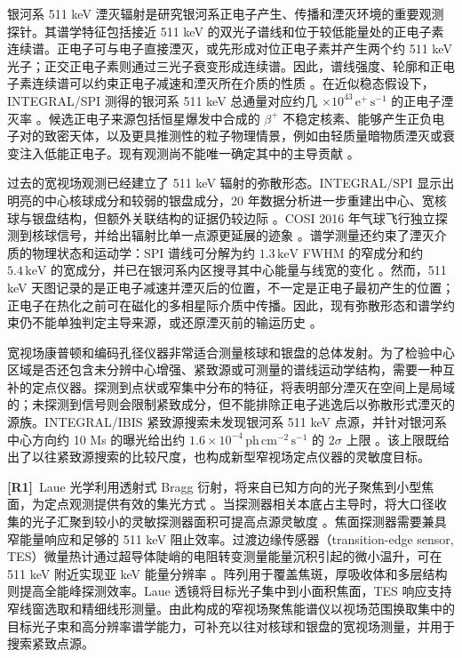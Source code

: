 \documentclass[11pt]{article}
\newcommand{\revmark}[1]{\textcolor{revisionblue}{\textbf{[R#1]}}\ }
\newcommand{\keV}{\,\mathrm{keV}}
\newcommand{\phcms}{\,\mathrm{ph\,cm^{-2}\,s^{-1}}}
\begin{document}
银河系 511 keV 湮灭辐射是研究银河系正电子产生、传播和湮灭环境的重要观测探针。其谱学特征包括接近 511 keV 的双光子谱线和位于较低能量处的正电子素连续谱。正电子可与电子直接湮灭，或先形成对位正电子素并产生两个约 511 keV 光子；正交正电子素则通过三光子衰变形成连续谱。因此，谱线强度、轮廓和正电子素连续谱可以约束正电子减速和湮灭所在介质的性质 \cite{Prantzos2011,Jean2006}。在近似稳态假设下，INTEGRAL/SPI 测得的银河系 511 keV 总通量对应约几 $\times10^{43}\,\mathrm{e^+\,s^{-1}}$ 的正电子湮灭率 \cite{Prantzos2011,Kierans2020}。候选正电子来源包括恒星爆发中合成的 $\beta^+$ 不稳定核素、能够产生正负电子对的致密天体，以及更具推测性的粒子物理情景，例如由轻质量暗物质湮灭或衰变注入低能正电子。现有观测尚不能唯一确定其中的主导贡献 \cite{Prantzos2011,Siegert2016AA,Siegert2016V404}。

过去的宽视场观测已经建立了 511 keV 辐射的弥散形态。INTEGRAL/SPI 显示出明亮的中心核球成分和较弱的银盘成分，20 年数据分析进一步重建出中心、宽核球与银盘结构，但额外关联结构的证据仍较边际 \cite{Knodlseder2005AllSky,Siegert2016AA,Yoneda2025}。COSI 2016 年气球飞行独立探测到核球信号，并给出辐射比单一点源更延展的迹象 \cite{Kierans2020,Siegert2020COSI}。谱学测量还约束了湮灭介质的物理状态和运动学：SPI 谱线可分解为约 $1.3\keV$ FWHM 的窄成分和约 $5.4\keV$ 的宽成分，并已在银河系内区搜寻其中心能量与线宽的变化 \cite{Jean2006,Siegert2019Kinematics}。然而，511 keV 天图记录的是正电子减速并湮灭后的位置，不一定是正电子最初产生的位置；正电子在热化之前可在磁化的多相星际介质中传播。因此，现有弥散形态和谱学约束仍不能单独判定主导来源，或还原湮灭前的输运历史 \cite{Prantzos2011}。

宽视场康普顿和编码孔径仪器非常适合测量核球和银盘的总体发射。为了检验中心区域是否还包含未分辨中心增强、紧致源或可测量的谱线运动学结构，需要一种互补的定点仪器。探测到点状或窄集中分布的特征，将表明部分湮灭在空间上是局域的；未探测到信号则会限制紧致成分，但不能排除正电子逃逸后以弥散形式湮灭的源族。INTEGRAL/IBIS 紧致源搜索未发现银河系 511 keV 点源，并针对银河系中心方向约 10 Ms 的曝光给出约 $1.6\times10^{-4}\phcms$ 的 $2\sigma$ 上限 \cite{DeCesare2011}。该上限既给出了以往紧致源搜索的比较尺度，也构成新型窄视场定点仪器的灵敏度目标。

\revmark{1}Laue 光学利用透射式 Bragg 衍射，将来自已知方向的光子聚焦到小型焦面，为定点观测提供有效的集光方式 \cite{Barriere2009Laue,Barriere2011LauePrototype}。当探测器相关本底占主导时，将大口径收集的光子汇聚到较小的灵敏探测器面积可提高点源灵敏度 \cite{Weidenspointner2006MAX}。焦面探测器需要兼具窄能量响应和足够的 511 keV 阻止效率。过渡边缘传感器（transition-edge sensor, TES）微量热计通过超导体陡峭的电阻转变测量能量沉积引起的微小温升，可在 511 keV 附近实现亚 keV 能量分辨率 \cite{Shirazi2023,Zhang2022TESGamma}。阵列用于覆盖焦斑，厚吸收体和多层结构则提高全能峰探测效率。Laue 透镜将目标光子集中到小面积焦面，TES 响应支持窄线窗选取和精细线形测量。由此构成的窄视场聚焦能谱仪以视场范围换取集中的目标光子束和高分辨率谱学能力，可补充以往对核球和银盘的宽视场测量，并用于搜索紧致点源。
\end{document}
